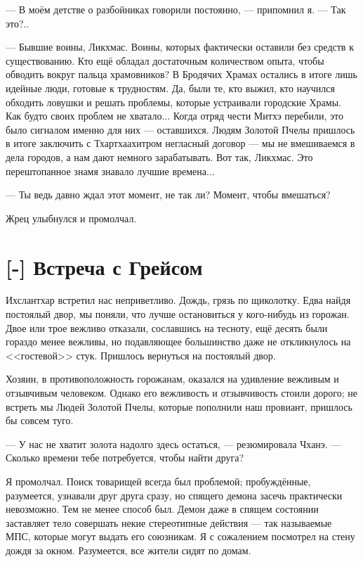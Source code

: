 --- В моём детстве о разбойниках говорили постоянно, --- припомнил я.
--- Так это?..

--- Бывшие воины, Ликхмас.
Воины, которых фактически оставили без средств к существованию.
Кто ещё обладал достаточным количеством опыта, чтобы обводить вокруг пальца храмовников?
В Бродячих Храмах остались в итоге лишь идейные люди, готовые к трудностям.
Да, были те, кто выжил, кто научился обходить ловушки и решать проблемы, которые устраивали городские Храмы.
Как будто своих проблем не хватало...
Когда отряд чести Митхэ перебили, это было сигналом именно для них --- оставшихся.
Людям Золотой Пчелы пришлось в итоге заключить с Тхартхаахитром негласный договор --- мы не вмешиваемся в дела городов, а нам дают немного зарабатывать.
Вот так, Ликхмас.
Это перештопанное знамя знавало лучшие времена...

--- Ты ведь давно ждал этот момент, не так ли?
Момент, чтобы вмешаться?

Жрец улыбнулся и промолчал.

\section{[-] Встреча с Грейсом}

Ихслантхар встретил нас неприветливо.
Дождь, грязь по щиколотку.
Едва найдя постоялый двор, мы поняли, что лучше остановиться у кого-нибудь из горожан.
Двое или трое вежливо отказали, сославшись на тесноту, ещё десять были гораздо менее вежливы, но подавляющее большинство даже не откликнулось на <<гостевой>> стук.
Пришлось вернуться на постоялый двор.

Хозяин, в противоположность горожанам, оказался на удивление вежливым и отзывчивым человеком.
Однако его вежливость и отзывчивость стоили дорого;
не встреть мы Людей Золотой Пчелы, которые пополнили наш провиант, пришлось бы совсем туго.

--- У нас не хватит золота надолго здесь остаться, --- резюмировала Чханэ.
--- Сколько времени тебе потребуется, чтобы найти друга?

Я промолчал.
Поиск товарищей всегда был проблемой;
пробуждённые, разумеется, узнавали друг друга сразу, но спящего демона засечь практически невозможно.
Тем не менее способ был.
Демон даже в спящем состоянии заставляет тело совершать некие стереотипные действия --- так называемые МПС\FM, которые могут выдать его союзникам.
Я с сожалением посмотрел на стену дождя за окном.
Разумеется, все жители сидят по домам.


